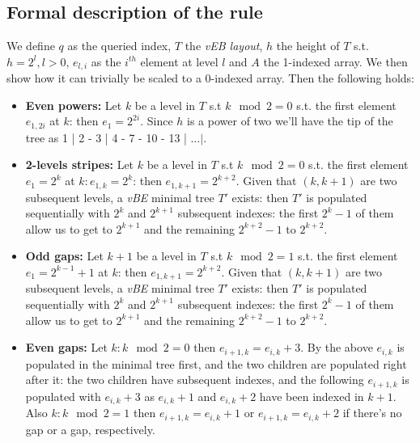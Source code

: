 \subsection{Formal description of the rule}
We define $q$ as the queried index, $T$ the \emph{vEB layout}, $h$ the height of $T$ s.t. $h = 2^l, l > 0$, $e_{l, i}$ as the $i^{th}$ element at level $l$ and $A$ the 1-indexed array. We then show how it can trivially be scaled to a 0-indexed array. Then the following holds:
\begin{itemize}
    \label{15_even_power} \item \textbf{Even powers:} Let $k$ be a level in $T$ s.t $k \mod 2 = 0$ s.t. the first element $e_{1, 2i}$ at $k$: then $e_1 = 2^{2i}$.
    Since $h$ is a power of two we'll have the tip of the tree as 1 | 2 - 3 | 4 - 7 - 10 - 13 | $\dots |$.
    \label{15_2-level_stripe}~\item \textbf{2-levels stripes:} Let $k$ be a level in $T$ s.t $k \mod 2 = 0$ s.t. the first element $e_1 = 2^k$ at $k: e_{1, k} = 2^k$: then $e_{1, k + 1} = 2^{k + 2}$.
    Given that $(k, k + 1)$ are two subsequent levels, a \emph{vBE} minimal tree $T'$ exists: then $T'$ is populated sequentially with $2^k$ and $2^{k + 1}$ subsequent indexes: the first $2^k - 1$ of them allow us to get to $2^{k + 1}$ and the remaining $2^{k + 2} - 1$ to $2^{k + 2}$.
    \label{15_k_plus_1_gap}~\item \textbf{Odd gaps:} Let $k + 1$ be a level in $T$ s.t $k \mod 2 = 1$ s.t. the first element $e_1 = 2^{k - 1} + 1$ at $k$: then $e_{1, k + 1} = 2^{k + 2}$.
    Given that $(k, k + 1)$ are two subsequent levels, a \emph{vBE} minimal tree $T'$ exists: then $T'$ is populated sequentially with $2^k$ and $2^{k + 1}$ subsequent indexes: the first $2^k - 1$ of them allow us to get to $2^{k + 1}$ and the remaining $2^{k + 2} - 1$ to $2^{k + 2}$.
    \label{15_k_plus_3_gap}~\item \textbf{Even gaps:} Let $k: k \mod 2 = 0$ then $e_{i + 1, k} = e_{i, k} + 3$.
    By the above $e_{i, k}$ is populated in the minimal tree first, and the two children are populated right after it: the two children have subsequent indexes, and the following $e_{i + 1, k}$ is populated with $e_{i, k} + 3$ as $e_{i, k} + 1$ and $e_{i, k} + 2$ have been indexed in $k + 1$.
    Also $k: k \mod 2 = 1$ then $e_{i + 1, k} = e_{i, k} + 1$ or $e_{i + 1, k} = e_{i, k} + 2$ if there's no gap or a gap, respectively.
\end{itemize}

